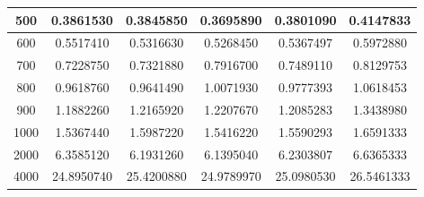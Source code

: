 \documentclass{article}
\begin{document}
\begin{table}[H]
\begin{tabular}{|c|ccc|c|c|}
    500                & \multicolumn{1}{c|}{0.3861530}   & \multicolumn{1}{c|}{0.3845850}   & 0.3695890   & 0.3801090                                                                         & 0.4147833                                                                             \\ \hline
    600                & \multicolumn{1}{c|}{0.5517410}   & \multicolumn{1}{c|}{0.5316630}   & 0.5268450   & 0.5367497                                                                         & 0.5972880                                                                             \\ \hline
    700                & \multicolumn{1}{c|}{0.7228750}   & \multicolumn{1}{c|}{0.7321880}   & 0.7916700   & 0.7489110                                                                         & 0.8129753                                                                             \\ \hline
    800                & \multicolumn{1}{c|}{0.9618760}   & \multicolumn{1}{c|}{0.9641490}   & 1.0071930   & 0.9777393                                                                         & 1.0618453                                                                             \\ \hline
    900                & \multicolumn{1}{c|}{1.1882260}   & \multicolumn{1}{c|}{1.2165920}   & 1.2207670   & 1.2085283                                                                         & 1.3438980                                                                             \\ \hline
    1000               & \multicolumn{1}{c|}{1.5367440}   & \multicolumn{1}{c|}{1.5987220}   & 1.5416220   & 1.5590293                                                                         & 1.6591333                                                                             \\ \hline
    2000               & \multicolumn{1}{c|}{6.3585120}   & \multicolumn{1}{c|}{6.1931260}   & 6.1395040   & 6.2303807                                                                         & 6.6365333                                                                             \\ \hline
    4000               & \multicolumn{1}{c|}{24.8950740}  & \multicolumn{1}{c|}{25.4200880}  & 24.9789970  & 25.0980530                                                                        & 26.5461333                                                                            \\ \hline

\end{tabular}
\end{table}
\end{document}
